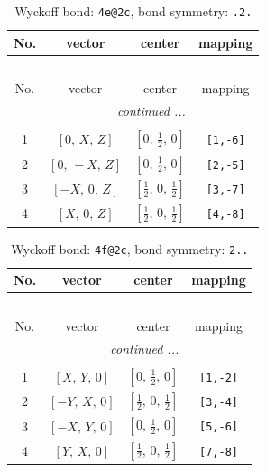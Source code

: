 \documentclass[fleqn,8pt]{jsarticle}
\begin{document}
\renewcommand{\arraystretch}{1.2}
\begin{longtable}{cccc}
\caption{Wyckoff bond: {\tt 4e@2c}, bond symmetry: {\tt .2.}}
 \\
 \hline \hline
No. & vector & center & mapping \\ \hline \endfirsthead

\multicolumn{3}{l}{\tablename\ \thetable{}} \\
 \hline \hline
No. & vector & center & mapping \\ \hline \endhead

 \hline \hline
\multicolumn{3}{r}{\footnotesize\it continued ...} \\ \endfoot

 \hline \hline
\multicolumn{3}{r}{} \\ \endlastfoot

1 & $\left[ 0,\, X,\, Z \right]$ & $\left[ 0,\, \frac{1}{2},\, 0 \right]$ & {\tt [1,-6]} \\ \hline
2 & $\left[ 0,\, - X,\, Z \right]$ & $\left[ 0,\, \frac{1}{2},\, 0 \right]$ & {\tt [2,-5]} \\ \hline
3 & $\left[ - X,\, 0,\, Z \right]$ & $\left[ \frac{1}{2},\, 0,\, \frac{1}{2} \right]$ & {\tt [3,-7]} \\ \hline
4 & $\left[ X,\, 0,\, Z \right]$ & $\left[ \frac{1}{2},\, 0,\, \frac{1}{2} \right]$ & {\tt [4,-8]} \\
\end{longtable}
\renewcommand{\arraystretch}{1.2}
\begin{longtable}{cccc}
\caption{Wyckoff bond: {\tt 4f@2c}, bond symmetry: {\tt 2..}}
 \\
 \hline \hline
No. & vector & center & mapping \\ \hline \endfirsthead

\multicolumn{3}{l}{\tablename\ \thetable{}} \\
 \hline \hline
No. & vector & center & mapping \\ \hline \endhead

 \hline \hline
\multicolumn{3}{r}{\footnotesize\it continued ...} \\ \endfoot

 \hline \hline
\multicolumn{3}{r}{} \\ \endlastfoot

1 & $\left[ X,\, Y,\, 0 \right]$ & $\left[ 0,\, \frac{1}{2},\, 0 \right]$ & {\tt [1,-2]} \\ \hline
2 & $\left[ - Y,\, X,\, 0 \right]$ & $\left[ \frac{1}{2},\, 0,\, \frac{1}{2} \right]$ & {\tt [3,-4]} \\ \hline
3 & $\left[ - X,\, Y,\, 0 \right]$ & $\left[ 0,\, \frac{1}{2},\, 0 \right]$ & {\tt [5,-6]} \\ \hline
4 & $\left[ Y,\, X,\, 0 \right]$ & $\left[ \frac{1}{2},\, 0,\, \frac{1}{2} \right]$ & {\tt [7,-8]} \\
\end{longtable}
\end{document}
